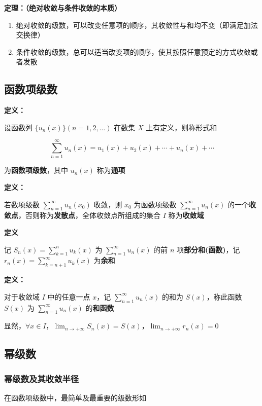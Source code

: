 \documentclass[lang = zh , final , oneside , openany , titlepage , zihao = -4 , linespread = 1.3 , baselineskip = false , cjk-font = windows , text-font = newtx , math-font = newtx]{sjtureport}
\begin{document}
\textbf{定理：（绝对收敛与条件收敛的本质）}

\begin{enumerate}
    \item 绝对收敛的级数，可以改变任意项的顺序，其收敛性与和均不变（即满足加法交换律）
    \item 条件收敛的级数，总可以适当改变项的顺序，使其按照任意预定的方式收敛或者发散
\end{enumerate}

\subsection{函数项级数}

\textbf{定义：}

设函数列 \(\{u_n(x)\} (n = 1,2,\ldots)\) 在数集 \(X\) 上有定义，则称形式和

\[
\sum_{n = 1}^\infty u_n(x)= u_1(x) + u_2(x) + \cdots + u_n(x) + \cdots 
\]

为\textbf{函数项级数}，其中 \(u_n(x)\) 称为\textbf{通项}

\textbf{定义：}

若数项级数 \(\sum_{n = 1}^\infty u_n(x_0)\) 收敛，则 \(x_0\) 为函数项级数 \(\sum_{n = 1}^\infty u_n(x)\) 的一个\textbf{收敛点}，否则称为\textbf{发散点}，全体收敛点所组成的集合 \(I\) 称为\textbf{收敛域}

\textbf{定义}

记 \(S_n(x) =\sum_{k = 1}^n u_k(x)\) 为 \(\sum_{n = 1}^\infty u_n(x)\) 的前 \(n\) 项\textbf{部分和(函数)}，记 \(r_n(x) = \sum_{k = n + 1}^\infty u_k(x)\) 为\textbf{余和}

\textbf{定义：}

对于收敛域 \(I\) 中的任意一点 \(x\)，记 \(\sum_{n = 1}^\infty u_n(x)\) 的和为 \(S(x)\)，称此函数 \(S(x)\) 为 \(\sum_{n = 1}^\infty u_n(x)\) 的\textbf{和函数}

显然，\(\forall x\in I\)，\(\lim_{n\to +\infty}S_n(x) = S(x)\)，\(\lim_{n\to +\infty}r_n(x)=0\)

\subsection{幂级数}

\subsubsection{幂级数及其收敛半径}

在函数项级数中，最简单及最重要的级数形如
\end{document}
